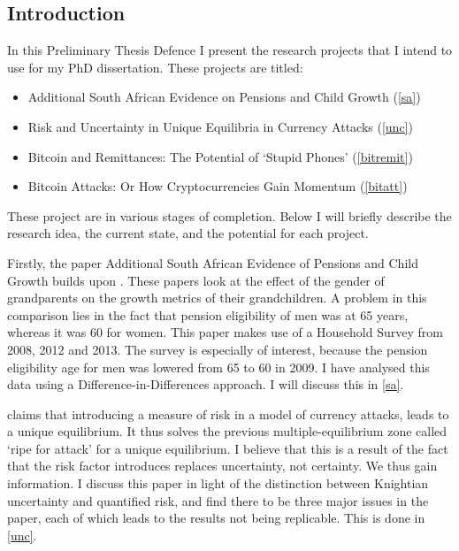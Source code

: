 \begin{refsection}
\chapter{Introduction}
\label{intro}
In this Preliminary Thesis Defence I present the research projects that I intend to use for my PhD dissertation. These projects are titled:

\begin{itemize}
  \item Additional South African Evidence on Pensions and Child Growth (\autoref{sa})
  \item Risk and Uncertainty in Unique Equilibria in Currency Attacks (\autoref{unc})
  \item Bitcoin and Remittances: The Potential of `Stupid Phones' (\autoref{bitremit})
  \item Bitcoin Attacks: Or How Cryptocurrencies Gain Momentum (\autoref{bitatt})
\end{itemize}

These project are in various stages of completion.
Below I will briefly describe the research idea, the current state, and the potential for each project.

Firstly, the paper Additional South African Evidence of Pensions and Child Growth builds upon \textcite{duflo2000child, duflo2003grandmothers}.
These papers look at the effect of the gender of grandparents on the growth metrics of their grandchildren.
A problem in this comparison lies in the fact that pension eligibility of men was at 65 years, whereas it was 60 for women.
This paper makes use of a Household Survey from 2008, 2012 and 2013. The 
survey is especially of interest, because the pension eligibility age for men was lowered from 65 to 60 in 2009.
I have analysed this data using a Difference-in-Differences approach.
I will discuss this in \autoref{sa}.

\textcite{morris1998unique} claims that introducing a measure of risk in a model of currency attacks, leads to a unique equilibrium.
It thus solves the previous multiple-equilibrium zone called `ripe for attack' for a unique equilibrium.
I believe that this is a result of the fact that the risk factor introduces replaces uncertainty, not certainty.
We thus gain information.
I discuss this paper in light of the distinction between Knightian uncertainty and quantified risk,
and find there to be three major issues in the paper, each of which leads to the results not being replicable.
This is done in \autoref{unc}.


\end{refsection}
